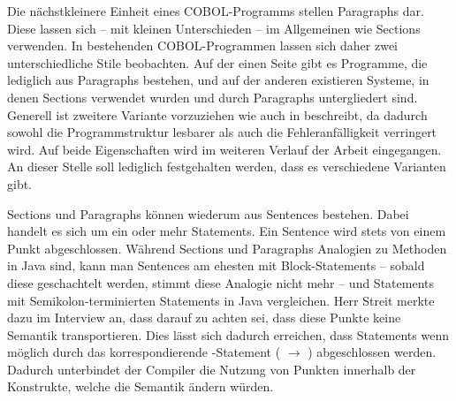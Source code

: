 Die nächstkleinere Einheit eines COBOL-Programms stellen Paragraphs dar. Diese lassen sich -- mit kleinen Unterschieden -- im Allgemeinen wie Sections verwenden. In bestehenden COBOL-Programmen lassen sich daher zwei unterschiedliche Stile beobachten. Auf der einen Seite gibt es Programme, die lediglich aus Paragraphs bestehen, und auf der anderen existieren Systeme, in denen Sections verwendet wurden und durch Paragraphs untergliedert sind. Generell ist zweitere Variante vorzuziehen wie auch \citeauthor{richards_enhancing_1984} in  beschreibt, da dadurch sowohl die Programmstruktur lesbarer als auch die Fehleranfälligkeit verringert wird. Auf beide Eigenschaften wird im weiteren Verlauf der Arbeit eingegangen. An dieser Stelle soll lediglich festgehalten werden, dass es verschiedene Varianten gibt.

Sections und Paragraphs können wiederum aus Sentences bestehen. Dabei handelt es sich um ein oder mehr Statements. Ein Sentence wird stets von einem Punkt abgeschlossen. Während Sections und Paragraphs Analogien zu Methoden in Java sind, kann man Sentences am ehesten mit Block-Statements -- sobald diese geschachtelt werden, stimmt diese Analogie nicht mehr -- und Statements mit Semikolon-terminierten Statements in Java vergleichen. Herr Streit merkte dazu im Interview an, dass darauf zu achten sei, dass diese Punkte keine Semantik transportieren. Dies lässt sich dadurch erreichen, dass Statements wenn möglich durch das korrespondierende -Statement (\zB {} $\rightarrow$ ) abgeschlossen werden. Dadurch unterbindet der Compiler die Nutzung von Punkten innerhalb der Konstrukte, welche die Semantik ändern würden.

